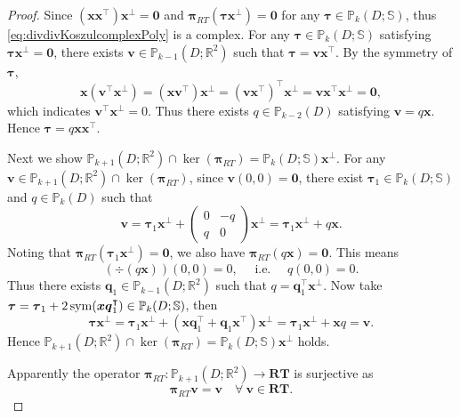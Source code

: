 \begin{proof}
Since $(\boldsymbol x\boldsymbol x^{\intercal})\boldsymbol x^{\perp}=\boldsymbol  0$ and $\boldsymbol \pi_{RT}(\boldsymbol \tau\boldsymbol x^{\perp})=\boldsymbol 0$ for any $\boldsymbol \tau\in\mathbb P_k(D;\mathbb S)$, thus \eqref{eq:divdivKoszulcomplexPoly} is a complex.
For any $\boldsymbol \tau\in\mathbb P_k(D;\mathbb S)$ satisfying $\boldsymbol \tau\boldsymbol x^{\perp}=\boldsymbol  0$, there exists $\boldsymbol  v\in \mathbb P_{k-1}(D;\mathbb R^2)$ such that $\boldsymbol \tau=\boldsymbol  v\boldsymbol  x^{\intercal}$. By the symmetry of $\boldsymbol \tau$,
\[
\boldsymbol  x(\boldsymbol  v^{\intercal}\boldsymbol x^{\perp})=(\boldsymbol  x\boldsymbol  v^{\intercal})\boldsymbol x^{\perp}=(\boldsymbol  v\boldsymbol  x^{\intercal})^{\intercal}\boldsymbol x^{\perp}=\boldsymbol  v\boldsymbol  x^{\intercal}\boldsymbol x^{\perp}=\boldsymbol 0,
\]
which indicates $\boldsymbol  v^{\intercal}\boldsymbol x^{\perp}=0$. Thus there exists $q\in\mathbb P_{k-2}(D)$ satisfying $\boldsymbol  v=q\boldsymbol  x$.
Hence $\boldsymbol \tau=q\boldsymbol  x\boldsymbol  x^{\intercal}$.

Next we show $\mathbb P_{k+1}(D;\mathbb R^2)\cap\ker(\boldsymbol \pi_{RT})=\mathbb P_k(D;\mathbb S)\boldsymbol x^{\perp}$.
For any $\boldsymbol  v\in\mathbb P_{k+1}(D;\mathbb R^2)\cap\ker(\boldsymbol \pi_{RT})$, since $\boldsymbol  v(0,0)=\boldsymbol 0$, there exist $\boldsymbol \tau_1\in\mathbb P_k(D;\mathbb S)$ and $q\in\mathbb P_k(D)$ such that
\[
\boldsymbol  v=\boldsymbol \tau_1\boldsymbol x^{\perp}+\begin{pmatrix}
0 & -q \\
q & 0
\end{pmatrix}\boldsymbol x^{\perp}=\boldsymbol \tau_1\boldsymbol x^{\perp}+q\boldsymbol  x.
\]
Noting that $\boldsymbol \pi_{RT}(\boldsymbol \tau_1\boldsymbol x^{\perp})=\boldsymbol 0$, we also have $\boldsymbol \pi_{RT}(q\boldsymbol  x)=\boldsymbol 0$. This means
\[
(\div(q\boldsymbol  x))(0,0)=0,\quad \textrm{ i.e. } \quad q(0,0)=0.
\]
Thus there exists $\boldsymbol  q_1\in\mathbb P_{k-1}(D;\mathbb R^2)$ such that $q=\boldsymbol  q_1^{\intercal}\boldsymbol x^{\perp}$.
Now take $\boldsymbol \tau=\boldsymbol \tau_1+2\operatorname{sym}(\boldsymbol  x\boldsymbol  q_1^{\intercal})\in\mathbb P_k(D;\mathbb S)$, then
\[
\boldsymbol \tau\boldsymbol x^{\perp}=\boldsymbol \tau_1\boldsymbol x^{\perp}+(\boldsymbol  x\boldsymbol  q_1^{\intercal}+\boldsymbol  q_1\boldsymbol  x^{\intercal})\boldsymbol x^{\perp}=\boldsymbol \tau_1\boldsymbol x^{\perp}+\boldsymbol  x q=\boldsymbol  v.
\]
Hence $\mathbb P_{k+1}(D;\mathbb R^2)\cap\ker(\boldsymbol \pi_{RT})=\mathbb P_k(D;\mathbb S)\boldsymbol x^{\perp}$ holds.

Apparently the operator $\boldsymbol \pi_{RT}: \mathbb P_{k+1}(D;\mathbb R^2)\to\boldsymbol {RT}$ is surjective as
$$
\boldsymbol \pi_{RT}\boldsymbol  v=\boldsymbol  v\quad \forall~\boldsymbol  v\in\boldsymbol{RT}.
$$
\end{proof}

